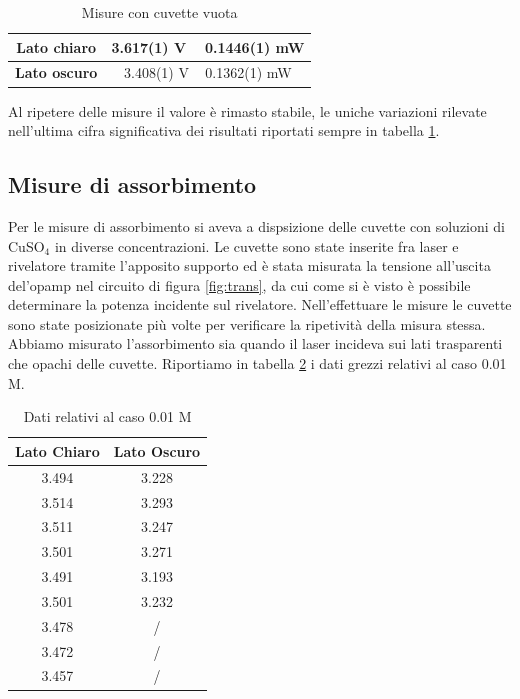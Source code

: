 \documentclass[10pt,letterpaper]{article}
\begin{document}
\begin{table}[htp]
\centering
\caption{Misure con cuvette vuota}
\label{tab:empty}
\begin{tabular}{c|c}
\textbf{Lato chiaro} & 3.617(1) V ~ 0.1446(1) mW \\ 
\hline 
\textbf{Lato oscuro} & 3.408(1) V ~ 0.1362(1) mW \\ 
\end{tabular} 
\end{table}

Al ripetere delle misure il valore è rimasto stabile, le uniche variazioni rilevate nell'ultima cifra significativa dei risultati riportati sempre in tabella \ref{tab:empty}.

\subsection{Misure di assorbimento}

Per le misure di assorbimento si aveva a dispsizione delle cuvette con soluzioni di CuSO$_4$ in diverse concentrazioni. Le cuvette sono state inserite fra laser e rivelatore tramite l'apposito supporto ed è stata misurata la tensione all'uscita del'opamp nel circuito di figura \ref{fig:trans}, da cui come si è visto è possibile determinare la potenza incidente sul rivelatore. Nell'effettuare le misure le cuvette sono state posizionate più volte per verificare la ripetività della misura stessa. Abbiamo misurato l'assorbimento sia quando il laser incideva sui lati trasparenti che opachi delle cuvette. Riportiamo in tabella \ref{tab:001} i dati grezzi relativi al caso 0.01 M.

\begin{table}[htp]
\centering
\caption{Dati relativi al caso 0.01 M}
\label{tab:001}
\begin{tabular}{c|c}
\hline \textbf{Lato Chiaro} &\textbf{ Lato Oscuro} \\ 
\hline 
3.494 & 3.228 \\ 
\hline 
3.514 & 3.293 \\ 
 
3.511 & 3.247 \\ 
 
3.501 & 3.271 \\ 

3.491 & 3.193 \\ 
 
3.501 & 3.232 \\ 
 
3.478 & / \\		 

3.472 & / \\	 
 
3.457 & / \\ 
\hline
\end{tabular} 
\end{table}
\end{document}
